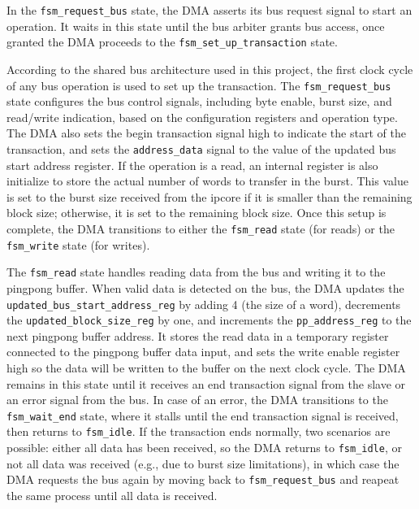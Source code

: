 \documentclass[a4paper,11pt,oneside]{report}
\begin{document}
In the \texttt{fsm\_request\_bus} state, the DMA asserts its bus request signal to start an operation.  
It waits in this state until the bus arbiter grants bus access, once granted the DMA proceeds to the \texttt{fsm\_set\_up\_transaction} state.

According to the shared bus architecture used in this project, the first clock cycle of any bus operation is used to set up the transaction.  
The \texttt{fsm\_request\_bus} state configures the bus control signals, including byte enable, burst size, and read/write indication, based on the configuration registers and operation type.  
The DMA also sets the begin transaction signal high to indicate the start of the transaction,  
and sets the \texttt{address\_data} signal to the value of the updated bus start address register.  
If the operation is a read, an internal register is also initialize to store the actual number of words to transfer in the burst.  
This value is set to the burst size received from the ipcore if it is smaller than the remaining block size; otherwise, it is set to the remaining block size.  
Once this setup is complete, the DMA transitions to either the \texttt{fsm\_read} state (for reads) or the \texttt{fsm\_write} state (for writes).

The \texttt{fsm\_read} state handles reading data from the bus and writing it to the pingpong buffer.  
When valid data is detected on the bus, the DMA updates the \texttt{updated\_bus\_start\_address\_reg} by adding 4 (the size of a word),  
decrements the \texttt{updated\_block\_size\_reg} by one,  
and increments the \texttt{pp\_address\_reg} to the next pingpong buffer address.  
It stores the read data in a temporary register connected to the pingpong buffer data input,  
and sets the write enable register high so the data will be written to the buffer on the next clock cycle.  
The DMA remains in this state until it receives an end transaction signal from the slave or an error signal from the bus.  
In case of an error, the DMA transitions to the \texttt{fsm\_wait\_end} state, where it stalls until the end transaction signal is received, then returns to \texttt{fsm\_idle}.  
If the transaction ends normally, two scenarios are possible:  
either all data has been received, so the DMA returns to \texttt{fsm\_idle},  
or not all data was received (e.g., due to burst size limitations), in which case the DMA requests the bus again by moving back to \texttt{fsm\_request\_bus} and reapeat the same process until all data is received.
\end{document}
